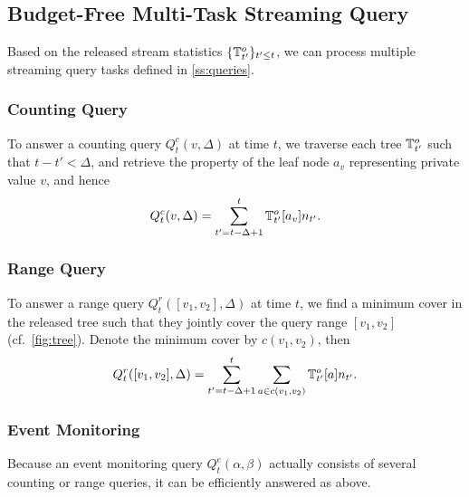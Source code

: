 
\subsection{Budget-Free Multi-Task Streaming Query}

Based on the released stream statistics $\{\mathbb{T}^o_{t'}\}_{t'\leq t}$, we can process
multiple streaming query tasks defined in \cref{ss:queries}.

\subsubsection{Counting Query}

To answer a counting query $Q_t^c(v,\Delta)$ at time $t$, we traverse each tree
$\mathbb{T}^o_{t'}$ such that $t - t' < \Delta$, and retrieve the property of the leaf
node $a_v$ representing private value $v$, and hence
\[
  Q_t^c(v,\Delta) = \sum_{t'=t-\Delta+1}^t \mathbb{T}^o_{t'}[a_v]n_{t'}.
\]

\subsubsection{Range Query}

To answer a range query $Q_t^r([v_1,v_2], \Delta)$ at time $t$, we find a
minimum cover in the released tree such that they jointly cover the query range
$[v_1,v_2]$ (cf.~\cref{fig:tree}).
Denote the minimum cover by $c(v_1,v_2)$, then
\[
  Q_t^r([v_1, v_2], \Delta) =
  \sum_{t'=t-\Delta+1}^t\sum_{a\in c(v_1,v_2)} \mathbb{T}^o_{t'}[a]n_{t'}.
\]

\subsubsection{Event Monitoring}

Because an event monitoring query $Q_t^e(\alpha,\beta)$ actually consists of
several counting or range queries, it can be efficiently
answered as above.
